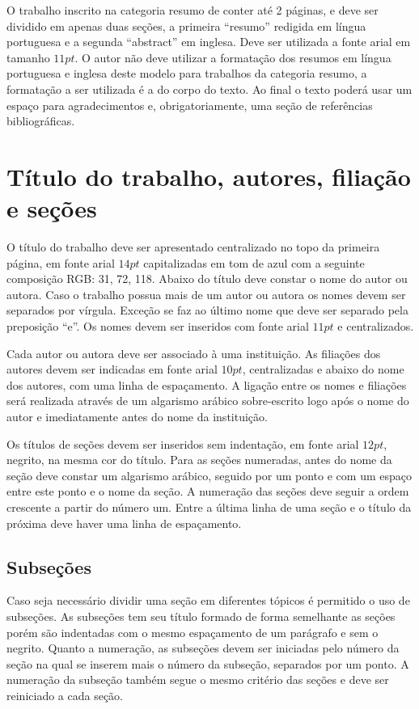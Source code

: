 \documentclass[]{workmicro2019} %
\begin{document}
\par O trabalho inscrito na categoria resumo de conter até 2 páginas, e deve ser dividido em apenas duas seções, a primeira ``resumo'' redigida em língua portuguesa e a segunda ``abstract'' em inglesa. Deve ser utilizada a fonte arial em tamanho $11pt$. O autor não deve utilizar a formatação dos resumos em língua portuguesa e inglesa deste modelo para trabalhos da categoria resumo, a formatação a ser utilizada é a do corpo do texto. Ao final o texto poderá usar um espaço para agradecimentos e, obrigatoriamente, uma seção de referências bibliográficas.


\section{Título do trabalho, autores, filiação e seções}

\par O título do trabalho deve ser apresentado centralizado no topo da primeira página, em fonte arial $14pt$ capitalizadas em tom de azul com a seguinte composição RGB: 31, 72, 118. Abaixo do título deve constar o nome do autor ou autora. Caso o trabalho possua mais de um autor ou autora os nomes devem ser separados por vírgula. Exceção se faz ao último nome que deve ser separado pela preposição ``e''. Os nomes devem ser inseridos com fonte arial $11pt$ e centralizados.

\par Cada autor ou autora deve ser associado à uma instituição. As filiações dos autores devem ser indicadas em fonte arial $10pt$, centralizadas e abaixo do nome dos autores, com uma linha de espaçamento. A ligação entre os nomes e filiações será realizada através de um algarismo arábico sobre-escrito logo após o nome do autor e imediatamente antes do nome da instituição.
\par Os títulos de seções devem ser inseridos sem indentação, em fonte arial $12pt$, negrito, na mesma cor do título. Para as seções numeradas, antes do nome da seção deve constar um algarismo arábico, seguido por um ponto e com um espaço entre este ponto e o nome da seção. A numeração das seções deve seguir a ordem crescente a partir do número um. Entre a última linha de uma seção e o título da próxima deve haver uma linha de espaçamento.

\subsection{Subseções}
\par Caso seja necessário dividir uma seção em diferentes tópicos é permitido o uso de subseções. As subseções tem seu título formado de forma semelhante as seções porém são indentadas com o mesmo espaçamento de um parágrafo e sem o negrito. Quanto a numeração, as subseções devem ser iniciadas pelo número da seção na qual se inserem mais o número da subseção, separados por um ponto. A numeração da subseção também segue o mesmo critério das seções e deve ser reiniciado a cada seção.
\end{document}
